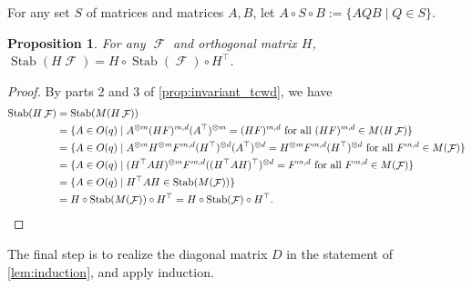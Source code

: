 \documentclass{article}
\newtheorem{proposition}{Proposition}[section]
\theoremstyle{remark}
\theoremstyle{definition}
\DeclareMathOperator{\fc}{\mathcal{F}}
\DeclareMathOperator{\stab}{Stab}
\begin{document}
For any set $S$ of matrices and matrices $A,B$, let $A \circ S \circ B := \{A  Q  B \mid Q \in S\}$.
\begin{proposition}
    For any $\fc$ and orthogonal matrix $H$, 
    $\stab(H\fc) = H \circ \stab(\fc) \circ H^\top$.
    \label{prop:stabbasis}
\end{proposition}
\begin{proof}
    By parts 2 and 3 of \autoref{prop:invariant_tcwd}, we have
    \begin{align*}
        \stab(H\fc) &= \stab(M(H\fc)) \\
        & = \{A \in O(q) \mid A^{\otimes m} (HF)^{m,d} (A^\top)^{\otimes m} = (HF)^{m,d}
        \text{ for all } (HF)^{m,d} \in M(H\fc) \} \\
        & = \{A \in O(q) \mid A^{\otimes m} H^{\otimes m} F^{m,d} (H^\top)^{\otimes d} (A^\top)^{\otimes d} = H^{\otimes m} F^{m,d} (H^\top)^{\otimes d}
        \text{ for all } F^{m,d} \in M(\fc) \} \\
        & = \{A \in O(q) \mid (H^\top A H)^{\otimes m} F^{m,d} ((H^\top A H)^\top)^{\otimes d} = F^{m,d} 
        \text{ for all } F^{m,d} \in M(\fc) \} \\
        & = \{A \in O(q) \mid H^\top A H \in \stab(M(\fc)) \} \\
        &= H \circ \stab(M(\fc)) \circ H^\top = H \circ \stab(\fc) \circ H^\top. \qedhere
    \end{align*}
\end{proof}
The final step is to realize the diagonal matrix $D$ in the statement of \autoref{lem:induction}, and
apply induction.
\end{document}
